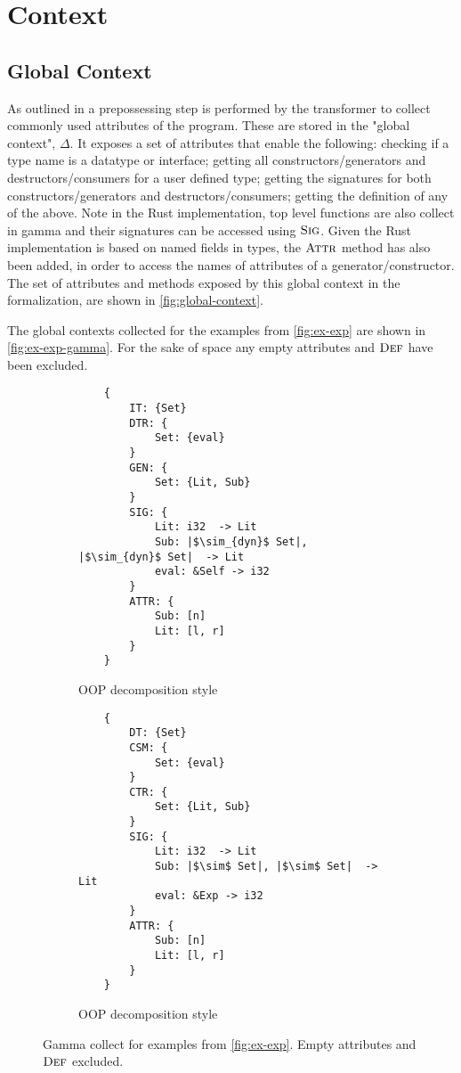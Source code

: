 \documentclass[ oneside,%
                    author={James Elgar},
                    degree={MEng},
                     title={Bidirectional transformer between functional and \\ object-oriented programming in Rust},
                  subtitle={}]{dissertation}
\begin{document}
\section{Context}

\subsection{Global Context}

As outlined in \cite{food} a prepossessing step is performed by the transformer to collect commonly used attributes of the program. These are stored in the "global context", $\Delta$. It exposes a set of attributes that enable the following: checking if a type name is a datatype or interface; getting all constructors/generators and destructors/consumers for a user defined type; getting the signatures for both constructors/generators and destructors/consumers; getting the definition of any of the above. Note in the Rust implementation, top level functions are also collect in gamma and their signatures can be accessed using $\textsc{Sig}$. Given the Rust implementation is based on named fields in types, the $\textsc{Attr}$ method has also been added, in order to access the names of attributes of a generator/constructor. 
The set of attributes and methods exposed by this global context in the formalization, are shown in \autoref{fig:global-context}.

The global contexts collected for the examples from \autoref{fig:ex-exp} are shown in \autoref{fig:ex-exp-gamma}. For the sake of space any empty attributes and $\textsc{Def}$ have been excluded.

\begin{figure}
\centering
\begin{subfigure}{.5\textwidth}
    \begin{verbatim}
    {
        IT: {Set}
        DTR: {
            Set: {eval}
        }
        GEN: {
            Set: {Lit, Sub}
        }
        SIG: {
            Lit: i32  -> Lit 
            Sub: |$\sim_{dyn}$ Set|, |$\sim_{dyn}$ Set|  -> Lit 
            eval: &Self -> i32 
        }
        ATTR: {
            Sub: [n]
            Lit: [l, r]
        }
    }
    \end{verbatim}
    \caption{OOP decomposition style}
\end{subfigure}%
\begin{subfigure}{.5\textwidth}
    \begin{verbatim}
    {
        DT: {Set}
        CSM: {
            Set: {eval}
        }
        CTR: {
            Set: {Lit, Sub}
        }
        SIG: {
            Lit: i32  -> Lit 
            Sub: |$\sim$ Set|, |$\sim$ Set|  -> Lit 
            eval: &Exp -> i32 
        }
        ATTR: {
            Sub: [n]
            Lit: [l, r]
        }
    }
    \end{verbatim}
    \caption{OOP decomposition style}
\end{subfigure}
\caption{Gamma collect for examples from \autoref{fig:ex-exp}. Empty attributes and $\textsc{Def}$ excluded.}
\label{fig:ex-exp-gamma}
\end{figure}
\end{document}
